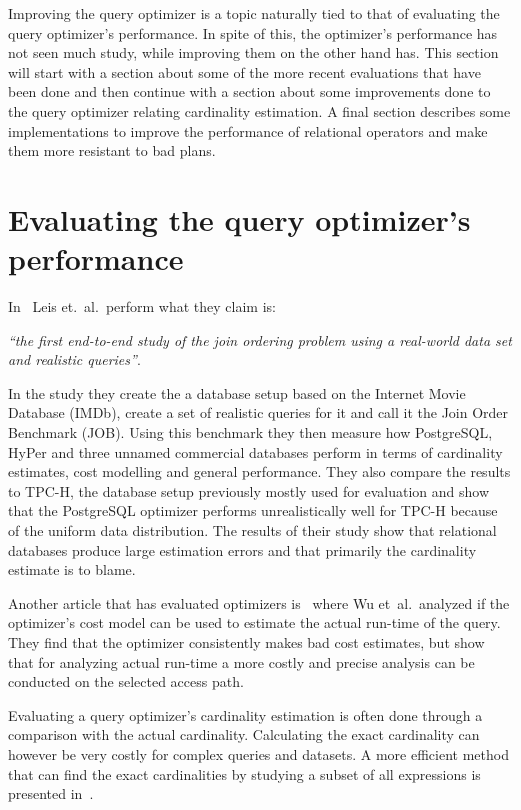 Improving the query optimizer is a topic naturally tied to that of evaluating
the query optimizer's performance. In spite of this, the optimizer's performance
has not seen much study, while improving them on the other hand has. This
section will start with a section about some of the more recent evaluations that
have been done and then continue with a section about some improvements done to
the query optimizer relating cardinality estimation. A final section describes
some implementations to improve the performance of relational operators and make
them more resistant to bad plans.

\section{Evaluating the query optimizer's performance}
In~\cite{leis_2015_how_hgaqor} Leis et.\ al.\ perform what they claim is:

\textit{``the first end-to-end study of the join ordering problem using a
  real-world data set and realistic queries''}.

In the study they create the a database setup based on the Internet Movie
Database (IMDb), create a set of realistic queries for it and call it the Join
Order Benchmark (JOB). Using this benchmark they then measure how PostgreSQL,
HyPer and three unnamed commercial databases perform in terms of cardinality
estimates, cost modelling and general performance. They also compare the results
to TPC-H, the database setup previously mostly used for evaluation and show that
the PostgreSQL optimizer performs unrealistically well for TPC-H because of the
uniform data distribution. The results of their study show that relational
databases produce large estimation errors and that primarily the cardinality
estimate is to blame.

Another article that has evaluated optimizers
is~\cite{wu_2013_predicting_pqetaocmru} where Wu  et\ al.\ analyzed if the
optimizer's cost model can be used to estimate the actual run-time of the query.
They find that the optimizer consistently makes bad cost estimates, but show
that for analyzing actual run-time a more costly and precise analysis can be
conducted on the selected access path.

Evaluating a query optimizer's cardinality estimation is often done through a
comparison with the actual cardinality. Calculating the exact cardinality can
however be very costly for complex queries and datasets. A more efficient method
that can find the exact cardinalities by studying a subset of all expressions is
presented in~\cite{chaudhuri_2009_exact_ecqofot}.

